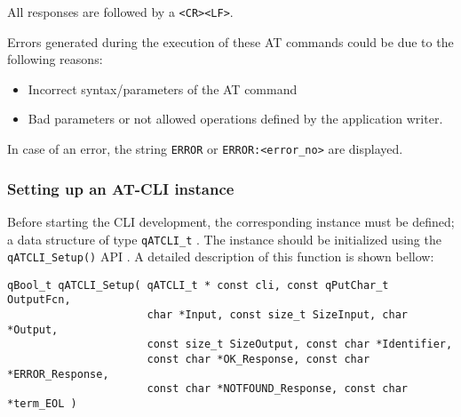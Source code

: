 All responses are followed by a \lstinline{<CR><LF>}.
\medskip

Errors generated during the execution of these AT commands could be due to the following reasons:
\begin{itemize}
    \item Incorrect syntax/parameters of the AT command
    \item Bad parameters or not allowed operations defined by the application writer.
\end{itemize}

In case of an error, the string \lstinline{ERROR} or \lstinline{ERROR:<error_no>} are displayed.

\subsubsection{Setting up an AT-CLI instance}
Before starting the CLI development, the corresponding instance must be defined; a data structure of type \lstinline{qATCLI_t} . 
The instance should be initialized using the \lstinline{qATCLI_Setup()} API . A detailed description of this function is shown bellow:
\medskip

\begin{lstlisting}[style=CStyle]
qBool_t qATCLI_Setup( qATCLI_t * const cli, const qPutChar_t OutputFcn, 
                      char *Input, const size_t SizeInput, char *Output, 
                      const size_t SizeOutput, const char *Identifier, 
                      const char *OK_Response, const char *ERROR_Response, 
                      const char *NOTFOUND_Response, const char *term_EOL )
\end{lstlisting}

